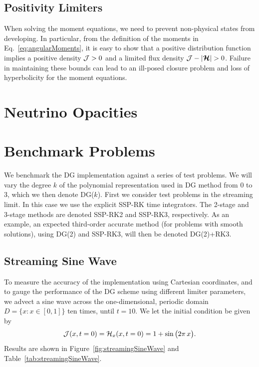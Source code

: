 \documentclass[10pt,preprint]{aastex}
\begin{document}
\subsection{Positivity Limiters}
\label{sec:positivityLimiters}

When solving the moment equations, we need to prevent non-physical states from developing.  
In particular, from the definition of the moments in Eq.~\eqref{eq:angularMoments}, it is easy to show that a positive distribution function implies a positive density $\mathcal{J}>0$ and a limited flux density $\cJ-|\bcH|>0$.  
Failure in maintaining these bounds can lead to an ill-posed closure problem and loss of hyperbolicity for the moment equations.  

\section{Neutrino Opacities}

\clearpage

\section{Benchmark Problems}

We benchmark the DG implementation against a series of test problems.  
We will vary the degree $k$ of the polynomial representation used in DG method from 0 to 3, which we then denote DG($k$).  
First we consider test problems in the streaming limit.  
In this case we use the explicit SSP-RK time integrators.  
The 2-stage and 3-stage methods are denoted SSP-RK2 and SSP-RK3, respectively.  
As an example, an expected third-order accurate method (for problems with smooth solutions), using DG(2) and SSP-RK3, will then be denoted DG(2)+RK3.  

\subsection{Streaming Sine Wave}

To measure the accuracy of the implementation using Cartesian coordinates, and to gauge the performance of the DG scheme using different limiter parameters, we advect a sine wave across the one-dimensional, periodic domain $D=\{x:x\in[0,1]\}$ ten times, until $t=10$.  
We let the initial condition be given by
\begin{equation}
  \mathcal{J}(x,t=0)=\mathcal{H}_{x}(x,t=0)=1+\sin\big(2\pi\,x\big).  
\end{equation}
Results are shown in Figure~\ref{fig:streamingSineWave} and Table~\ref{tab:streamingSineWave}.  
\end{document}

